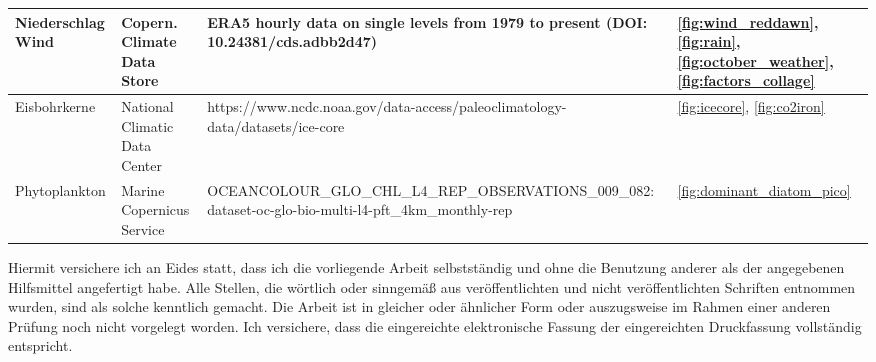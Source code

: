 \documentclass[12pt,a4paper,onecolumn,headheight=30pt]{scrartcl}
\begin{document}
\begin{table}[H]
\begin{scriptsize}
\begin{tabularx}{\textwidth}{p{2cm} p{2.5cm} X p{2cm}}
Niederschlag \newline Wind & Copern. Climate \newline Data Store & ERA5 hourly data on single levels from 1979 to present (DOI: 10.24381/cds.adbb2d47) & \ref{fig:wind_reddawn}, \ref{fig:rain}, \ref{fig:october_weather}, \ref{fig:factors_collage} \\ \midrule
Eisbohrkerne & National Climatic \newline Data Center &  https://www.ncdc.noaa.gov/data-access/paleoclimatology-data/datasets/ice-core & \ref{fig:icecore}, \ref{fig:co2iron} \\ \midrule
Phytoplankton & Marine Copernicus Service & OCEANCOLOUR_GLO_CHL_L4_REP_OBSERVATIONS_009_082: dataset-oc-glo-bio-multi-l4-pft_4km_monthly-rep & \ref{fig:dominant_diatom_pico} \\ 
\bottomrule
\end{tabularx}
\end{scriptsize}
\end{table}
Hiermit versichere ich an Eides statt, dass ich die vorliegende Arbeit selbstständig und ohne die Benutzung anderer als der angegebenen  Hilfsmittel angefertigt habe. Alle Stellen, die wörtlich oder sinngemäß  aus veröffentlichten und nicht veröffentlichten Schriften entnommen wurden,  sind als solche kenntlich gemacht. Die Arbeit ist in gleicher oder  ähnlicher Form oder  auszugsweise im Rahmen einer anderen Prüfung noch nicht vorgelegt worden. Ich versichere, dass die eingereichte  elektronische Fassung der eingereichten Druckfassung vollständig  entspricht.
\end{document}
